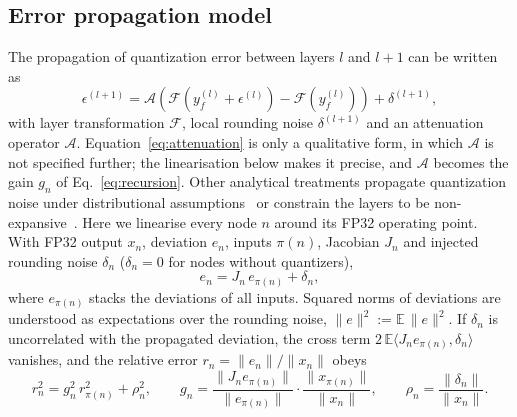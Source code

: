\documentclass[pdflatex,sn-mathphys-num]{sn-jnl}%
\theoremstyle{thmstyleone}%
\theoremstyle{thmstyletwo}%
\theoremstyle{thmstylethree}%
\begin{document}

\subsection{Error propagation model}\label{sec:propagation}

The propagation of quantization error between layers $l$ and $l+1$ can be written as
\begin{equation}
\epsilon^{(l+1)} = \mathcal{A}\left(\mathcal{F}(y_f^{(l)}+\epsilon^{(l)})-\mathcal{F}(y_f^{(l)})\right)+\delta^{(l+1)},
\label{eq:attenuation}
\end{equation}
with layer transformation $\mathcal{F}$, local rounding noise $\delta^{(l+1)}$ and an attenuation operator $\mathcal{A}$. Equation~\eqref{eq:attenuation} is only a qualitative form, in which $\mathcal{A}$ is not specified further; the linearisation below makes it precise, and $\mathcal{A}$ becomes the gain $g_n$ of Eq.~\eqref{eq:recursion}. Other analytical treatments propagate quantization noise under distributional assumptions~\cite{sakr2017analytical} or constrain the layers to be non-expansive~\cite{lin2019defensive}. Here we linearise every node $n$ around its FP32 operating point. With FP32 output $x_n$, deviation $e_n$, inputs $\pi(n)$, Jacobian $J_n$ and injected rounding noise $\delta_n$ ($\delta_n=0$ for nodes without quantizers),
\begin{equation}
e_n=J_n\,e_{\pi(n)}+\delta_n,\label{eq:linear}
\end{equation}
where $e_{\pi(n)}$ stacks the deviations of all inputs. Squared norms of deviations are understood as expectations over the rounding noise, $\lVert e\rVert^2:=\mathbb{E}\,\lVert e\rVert^2$. If $\delta_n$ is uncorrelated with the propagated deviation, the cross term $2\,\mathbb{E}\langle J_ne_{\pi(n)},\delta_n\rangle$ vanishes, and the relative error $r_n=\lVert e_n\rVert/\lVert x_n\rVert$ obeys
\begin{equation}
r_n^2=g_n^2\,r_{\pi(n)}^2+\rho_n^2,\qquad g_n=\frac{\lVert J_n e_{\pi(n)}\rVert}{\lVert e_{\pi(n)}\rVert}\cdot\frac{\lVert x_{\pi(n)}\rVert}{\lVert x_n\rVert},\qquad\rho_n=\frac{\lVert\delta_n\rVert}{\lVert x_n\rVert}.\label{eq:recursion}
\end{equation}
\end{document}

